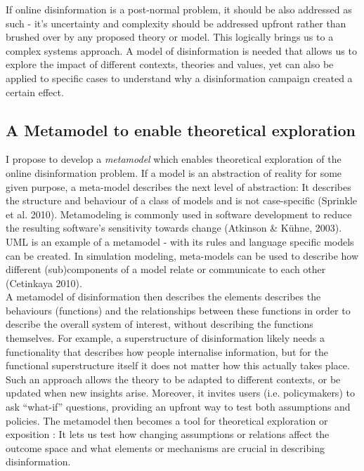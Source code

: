  If online disinformation is a post-normal problem, it should be also addressed as such - it's uncertainty and complexity should be addressed upfront rather than brushed over by any proposed theory or model. This logically brings us to a complex systems approach. A model of disinformation is needed that allows us to explore the impact of different contexts, theories and values, yet can also be applied to specific cases to understand why a disinformation campaign created a certain effect.

\subsection{A Metamodel to enable theoretical exploration}
I propose to develop a \textit{metamodel} which enables theoretical exploration of the online disinformation problem. If a model is an abstraction of reality for some given purpose, a meta-model describes the next level of abstraction: It describes the structure and behaviour of a class of models and is not case-specific (Sprinkle et al. 2010). Metamodeling is commonly used in software development to reduce the resulting software's sensitivity towards change (Atkinson \& Kühne, 2003). UML is an example of a metamodel - with its rules and language specific models can be created. In simulation modeling, meta-models can be used to describe how different (sub)components of a model relate or communicate to each other (Cetinkaya 2010). \\

A metamodel of disinformation then describes the elements describes the behaviours (functions) and the relationships between these functions in order to describe the overall system of interest, without describing the functions themselves. For example, a superstructure of disinformation likely needs a functionality that describes how people internalise information, but for the functional superstructure itself it does not matter how this actually takes place. Such an approach allows the theory to be adapted to different contexts, or be updated when new insights arise. Moreover, it invites users (i.e. policymakers) to ask “what-if” questions, providing an upfront way to test both assumptions and policies. The metamodel then becomes a tool for theoretical exploration or exposition \cite{Edmonds2017}: It lets us test how changing assumptions or relations affect the outcome space and what elements or mechanisms are crucial in describing disinformation.

\begin{comment}
Need to address this: 

This purpose is not so very different from that of exploratory modeling as described by Bankes (1993). He proposed exploratory modeling as an approach in cases where there is insufficient or uncertain knowledge about the system of interest. Exploratory modeling explores the consequences of changing assumptions or mechanisms through simulation experiments.
\end{comment}


